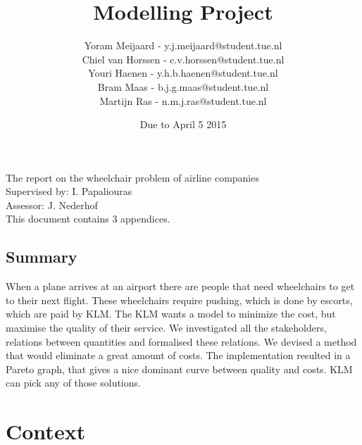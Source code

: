 \documentclass[a4paper, 11pt, notitlepage]{report}
\title{{\Huge Modelling Project} \vspace{290pt}} %
\author{Yoram Meijaard - y.j.meijaard@student.tue.nl\\Chiel van Horssen - c.v.horssen@student.tue.nl\\Youri Haenen - y.h.b.haenen@student.tue.nl\\Bram Maas - b.j.g.maas@student.tue.nl\\Martijn Ras - n.m.j.ras@student.tue.nl} %
\date{Due to April 5 2015} %
\begin{document}
\maketitle
\begin{center}
The report on the wheelchair problem of airline companies %
\\[12pt]
Supervised by: I. Papaliouras \\ Assessor: J. Nederhof %
\\[12pt]
This document contains 3 appendices.
\end{center}
\thispagestyle{empty}
\newpage


\tableofcontents





\pagebreak
\section{Summary}
	When a plane arrives at an airport there are people that need wheelchairs to get to their next flight. These wheelchairs require pushing, which is done by escorts, which are paid by KLM. The KLM wants a model to minimize the cost, but maximise the quality of their service. We investigated all the stakeholders, relations between quantities and formalised these relations. We devised a method that would eliminate a great amount of costs. The implementation resulted in a Pareto graph, that gives a nice dominant curve between quality and costs. KLM can pick any of those solutions.

\setcounter{chapter}{+5}
\chapter{Context}
\end{document}
